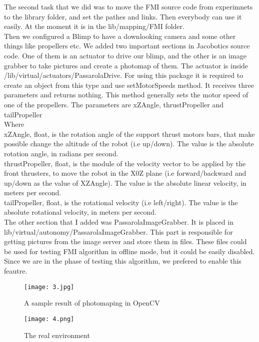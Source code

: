 \documentclass{article}
\begin{document}
The second task that we did was to move the FMI source code from experimnets to the library folder, and set the pathes and links. Then everybody can use it easily. At the moment it is in the lib/mapping/FMI folder. \\

Then we configured a Blimp to have a downlooking camera and some other things like propellers etc. We added two important sections in Jacobotics source code. One of them is an actuator to drive our blimp, and the other is an image grabber to take pictures and create a photomap of them. The actuator is inside /lib/virtual/actuators/PassarolaDrive. For using this package it is required to create an object from this type and use setMotorSpeeds method. It receives three parameters and returns nothing. This method generally sets the motor speed of one of the propellers. The parameters are xZAngle, thrustPropeller and tailPropeller\\
Where\\ xZAngle, float, is the rotation angle of the support thrust motors bars, that make possible change the
altitude of the robot (i.e up/down). The value is the absolute rotation angle, in radians per second.\\
thrustPropeller, float, is the module of the velocity vector to be applied by the front thrusters, to move the
robot in the X0Z plane (i.e forward/backward and up/down as the value of XZAngle). The value is the absolute linear
velocity, in meters per second.\\
tailPropeller, float, is the rotational velocity (i.e left/right). The value is the absolute rotational velocity, in meters per second.\\

The other section that I added was PassarolaImageGrabber. It is placed in lib/virtual/autonomy/PassarolaImageGrabber. This part is responsible for getting pictures from the image server and store them in files. These files could be used for testing FMI algorithm in offline mode, but it could be easily disabled. Since we are in the phase of testing this algorithm, we prefered to enable this feautre.\\
\begin{figure}
\begin{center}
\texttt{[image: 3.jpg]} 
\caption{A sample result of photomaping in OpenCV}
\end{center}
\end{figure}

\begin{figure}
\begin{center}
\texttt{[image: 4.png]} 
\caption{The real environment}
\end{center}
\end{figure}
\end{document}
